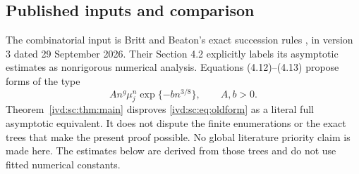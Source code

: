 \documentclass[11pt,letterpaper]{article}
\theoremstyle{remark}\newtheorem{remark}[theorem]{Remark}
\numberwithin{equation}{section}
\begin{document}
\subsection{Published inputs and comparison}
The combinatorial input is Britt and Beaton's exact succession rules
\cite[Sections 3.8--3.9, Lemmas 5--6 and Appendix A]{BB}, in version 3
dated 29 September 2026. Their Section 4.2 explicitly labels its
asymptotic estimates as nonrigorous numerical analysis. Equations
(4.12)--(4.13) propose forms of the type
\begin{equation}\label{ivd:sc:eq:oldform}
 A n^g\mu_j^n\exp\{-b n^{3/8}\},\qquad A,b>0.
\end{equation}
Theorem~\ref{ivd:sc:thm:main} disproves \eqref{ivd:sc:eq:oldform} as a literal full
asymptotic equivalent. It does not dispute the finite enumerations or the
exact trees that make the present proof possible. No global literature
priority claim is made here. The estimates below are derived from those
trees and do not use fitted numerical constants.
\end{document}
